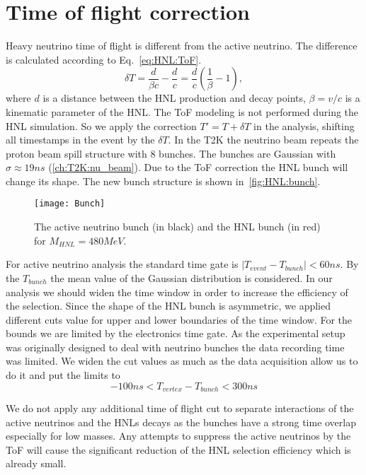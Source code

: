 \documentclass[../main.tex]{subfiles}
\begin{document}
\section{Time of flight correction}
\label{sec:HNL:tof_corr}
Heavy neutrino time of flight is different from the active neutrino. The difference is calculated according to Eq.~\ref{eq:HNL:ToF}.
\begin{equation}
  \delta T=\frac{d}{\beta c}-\frac{d}{c}=\frac{d}{c}\left(\frac{1}{\beta}-1\right),
  \label{eq:HNL:ToF}
\end{equation}
where $d$ is a distance between the HNL production and decay points, $\beta=v/c$ is a kinematic parameter of the HNL. The ToF modeling is not performed during the HNL simulation. So we apply the correction $T'=T+\delta T$ in the analysis, shifting all timestamps in the event by the $\delta T$. In the T2K the  neutrino beam repeats the proton beam spill structure with 8 bunches. The bunches are Gaussian with $\sigma\approx19ns$ (\autoref{ch:T2K:nu_beam}). Due to the ToF correction the HNL bunch will change its shape. The new bunch structure is shown in~\autoref{fig:HNL:bunch}.
\begin{figure}[!ht]
  \begin{center}
  \texttt{[image: Bunch]}
  \caption{The active neutrino bunch (in black) and the HNL bunch (in red) for $M_{HNL}=480MeV$.}
  \label{fig:HNL:bunch}
  \end{center}
\end{figure}

For active neutrino analysis the standard time gate is $\left|T_{event}-T_{bunch}\right|<60ns$. By the $T_{bunch}$ the mean value of the Gaussian distribution is considered. In our analysis we should widen the time window in order to increase the efficiency of the selection. Since the shape of the HNL bunch is asymmetric, we applied different cuts value for upper and lower boundaries of the time window. For the bounds we are limited by the electronics time gate. As the experimental setup was originally designed to deal with neutrino bunches the data recording time was limited. We widen the cut values as much as the data acquisition allow us to do it and put the limits to
\begin{equation}
    -100ns<T_{vertex}-T_{bunch}<300ns
\end{equation}

We do not apply any additional time of flight cut to separate interactions of the active neutrinos and the HNLs decays as the bunches have a strong time overlap especially for low masses. Any attempts to suppress the active neutrinos by the ToF will cause the significant reduction of the HNL selection efficiency which is already small.
\end{document}

